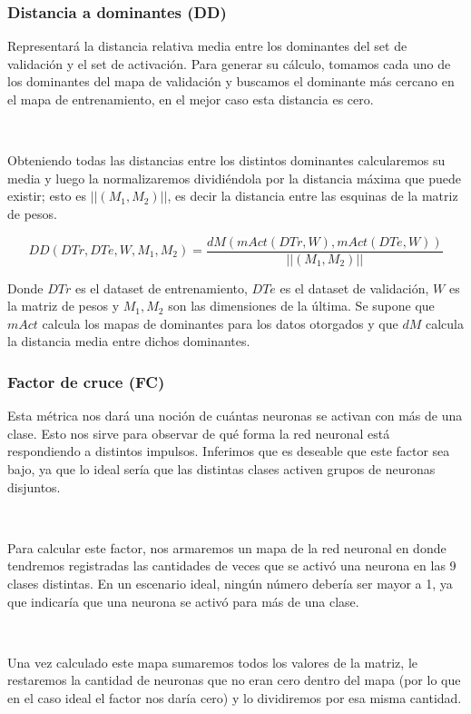 \documentclass[informe.tex]{subfiles}
\begin{document}
      \subsubsection{Distancia a dominantes (DD)}
      
      Representar\'a la distancia relativa media entre los dominantes del set de validaci\'on y el set de activaci\'on. Para generar su cálculo, tomamos cada uno de los dominantes del mapa de validación y buscamos el dominante más cercano en el mapa de entrenamiento, en el mejor caso esta distancia es cero. 
      
      ~
      
      Obteniendo todas las distancias entre los distintos dominantes calcularemos su media y luego la normalizaremos dividiéndola por la distancia máxima que puede existir; esto es $||(M_1,M_2)||$, es decir la distancia entre las esquinas de la matriz de pesos.
      
      $$DD(DTr, DTe, W, M_1, M_2) = \frac{dM(mAct(DTr,W), mAct(DTe,W))}{||(M_1,M_2)||}$$
      
      Donde $DTr$ es el dataset de entrenamiento, $DTe$ es el dataset de validación, $W$ es la matriz de pesos y $M_1, M_2$  son las dimensiones de la última. Se supone que $mAct$ calcula los mapas de dominantes para los datos otorgados y que $dM$ calcula la distancia media entre dichos dominantes.
      
      \subsubsection{Factor de cruce (FC)}
      
      Esta métrica nos dará una noción de cuántas neuronas se activan con más de una clase. Esto nos sirve para observar de qué forma la red neuronal está respondiendo a distintos impulsos. Inferimos que es deseable que este factor sea bajo, ya que lo ideal sería que las distintas clases activen grupos de neuronas disjuntos.
      
      ~
      
      Para calcular este factor, nos armaremos un mapa de la red neuronal en donde tendremos registradas las cantidades de veces que se activó una neurona en las 9 clases distintas. En un escenario ideal, ningún número debería ser mayor a 1, ya que indicaría que una neurona se activó para más de una clase.
      
      ~
      
      Una vez calculado este mapa sumaremos todos los valores de la matriz, le restaremos la cantidad de neuronas que no eran cero dentro del mapa (por lo que en el caso ideal el factor nos daría cero) y lo dividiremos por esa misma cantidad.
      
\end{document}
